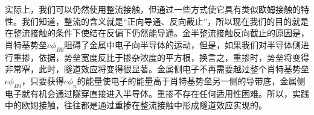 实际上，我们可以仍然使用整流接触，但通过一些方式使它具有类似欧姆接触的特性。我们知道，整流的含义就是“正向导通、反向截止”，所以现在我们的目的就是在整流接触的条件下使结在反偏下仍然能导通。金半整流接触反向截止的原因是，肖特基势垒$e\phi_{B0}$阻碍了金属中电子向半导体的运动，但是，如果我们对半导体侧进行重掺，依据，势垒宽度反比于掺杂浓度的平方根，换言之，重掺时，势垒将变得非常窄，此时，隧道效应将变得很显著。金属侧电子不再需要越过整个肖特基势垒$e\phi_{B0}$，只要获得$e\phi_n$的能量使电子的能量高于肖特基势垒另一侧的导带底，金属侧电子就有机会通过隧穿直接进入半导体。重掺不存在任何适用性困难。所以，实践中的欧姆接触，往往都是通过重掺在整流接触中形成隧道效应实现的。